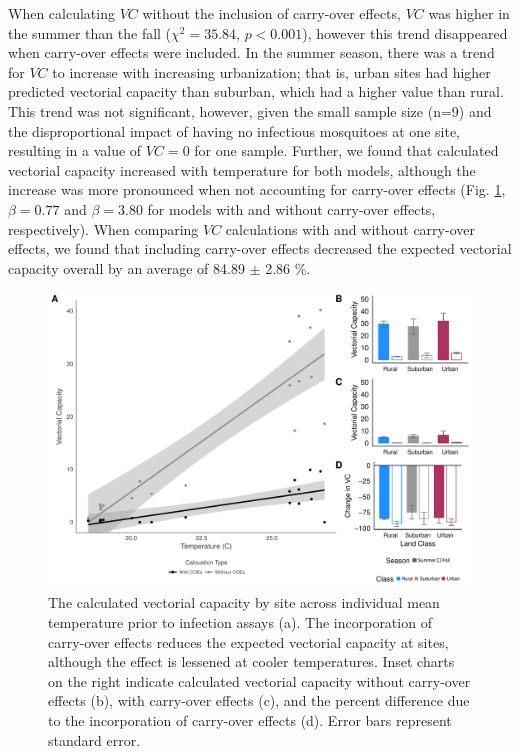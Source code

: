 \documentclass[12pt]{article}
\begin{document}
When calculating $VC$ without the inclusion of carry-over effects, $VC$ was  higher in the summer than the fall ($\chi^2=35.84$, $p<0.001$), however this trend disappeared when carry-over effects were included. In the summer season, there was a trend for $VC$ to increase with increasing urbanization; that is, urban sites had higher predicted vectorial capacity than suburban, which had a higher value than rural. This trend was not significant, however, given the small sample size (n=9) and the disproportional impact of having no infectious mosquitoes at one site, resulting in a value of $VC=0$ for one sample. Further, we found that calculated vectorial capacity increased with temperature for both models, although the increase was more pronounced when not accounting for carry-over effects (Fig. \ref{Fig:VC}, $\beta=0.77$ and $\beta=3.80$ for models with and without carry-over effects, respectively). When comparing $VC$ calculations with and without carry-over effects, we found that including carry-over effects decreased the expected vectorial capacity overall by an average of 84.89 $\pm$ 2.86 \%.

\begin{figure}
\centering\includegraphics[width=0.9\linewidth]{VCPlot.pdf}
\caption{The calculated vectorial capacity by site across individual mean temperature prior to infection assays (a). The incorporation of carry-over effects reduces the expected vectorial capacity at sites, although the effect is lessened at cooler temperatures. Inset charts on the right indicate calculated vectorial capacity without carry-over effects (b), with carry-over effects (c), and the percent difference due to the incorporation of carry-over effects (d). Error bars represent standard error.
}
\label{Fig:VC}
\end{figure}
\end{document}
